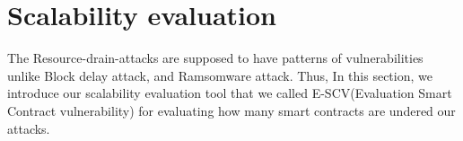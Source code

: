 \chapter{Scalability evaluation}
The Resource-drain-attacks are supposed to have patterns of vulnerabilities unlike Block delay attack, and Ramsomware attack. Thus, In this section, we introduce our scalability evaluation tool that we called E-SCV(Evaluation Smart Contract vulnerability) for evaluating how many smart contracts are undered our attacks.   




